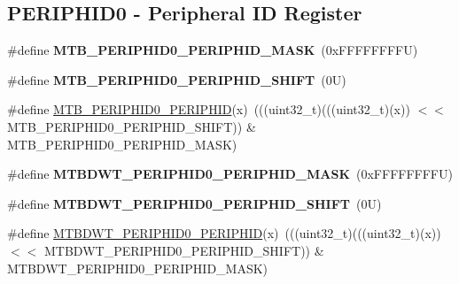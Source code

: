 \subsection*{P\+E\+R\+I\+P\+H\+I\+D0 -\/ Peripheral ID Register}
\begin{DoxyCompactItemize}
\item 
\mbox{\label{group___m_t_b___register___masks_ga7941db6c387b14842e373342233e164c}} 
\#define {\bfseries M\+T\+B\+\_\+\+P\+E\+R\+I\+P\+H\+I\+D0\+\_\+\+P\+E\+R\+I\+P\+H\+I\+D\+\_\+\+M\+A\+SK}~(0x\+F\+F\+F\+F\+F\+F\+F\+F\+U)
\item 
\mbox{\label{group___m_t_b___register___masks_gaaff3b063b90f3dde3415de21d0dcf3d5}} 
\#define {\bfseries M\+T\+B\+\_\+\+P\+E\+R\+I\+P\+H\+I\+D0\+\_\+\+P\+E\+R\+I\+P\+H\+I\+D\+\_\+\+S\+H\+I\+FT}~(0\+U)
\item 
\#define \mbox{\hyperlink{group___m_t_b___register___masks_gadf9a1a9741993d612dc88171d5a86a0c}{M\+T\+B\+\_\+\+P\+E\+R\+I\+P\+H\+I\+D0\+\_\+\+P\+E\+R\+I\+P\+H\+ID}}(x)~(((uint32\+\_\+t)(((uint32\+\_\+t)(x)) $<$$<$ M\+T\+B\+\_\+\+P\+E\+R\+I\+P\+H\+I\+D0\+\_\+\+P\+E\+R\+I\+P\+H\+I\+D\+\_\+\+S\+H\+I\+FT)) \& M\+T\+B\+\_\+\+P\+E\+R\+I\+P\+H\+I\+D0\+\_\+\+P\+E\+R\+I\+P\+H\+I\+D\+\_\+\+M\+A\+SK)
\item 
\mbox{\label{group___m_t_b___register___masks_ga72e68ff35b7952164566609bcfda90cd}} 
\#define {\bfseries M\+T\+B\+D\+W\+T\+\_\+\+P\+E\+R\+I\+P\+H\+I\+D0\+\_\+\+P\+E\+R\+I\+P\+H\+I\+D\+\_\+\+M\+A\+SK}~(0x\+F\+F\+F\+F\+F\+F\+F\+F\+U)
\item 
\mbox{\label{group___m_t_b___register___masks_ga0414df0247532ec3d97e2a15f2ab5419}} 
\#define {\bfseries M\+T\+B\+D\+W\+T\+\_\+\+P\+E\+R\+I\+P\+H\+I\+D0\+\_\+\+P\+E\+R\+I\+P\+H\+I\+D\+\_\+\+S\+H\+I\+FT}~(0\+U)
\item 
\#define \mbox{\hyperlink{group___m_t_b___register___masks_gae7cd120235fd7c30a2943dfac6f49015}{M\+T\+B\+D\+W\+T\+\_\+\+P\+E\+R\+I\+P\+H\+I\+D0\+\_\+\+P\+E\+R\+I\+P\+H\+ID}}(x)~(((uint32\+\_\+t)(((uint32\+\_\+t)(x)) $<$$<$ M\+T\+B\+D\+W\+T\+\_\+\+P\+E\+R\+I\+P\+H\+I\+D0\+\_\+\+P\+E\+R\+I\+P\+H\+I\+D\+\_\+\+S\+H\+I\+FT)) \& M\+T\+B\+D\+W\+T\+\_\+\+P\+E\+R\+I\+P\+H\+I\+D0\+\_\+\+P\+E\+R\+I\+P\+H\+I\+D\+\_\+\+M\+A\+SK)
\item 

\end{DoxyCompactItemize}
